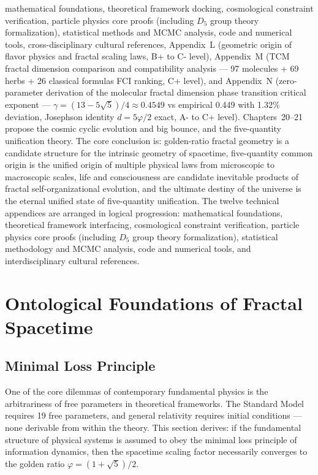 \documentclass[12pt,a4paper,twocolumn]{article}
\renewcommand{\phi}{\varphi}
\begin{document}
mathematical foundations, theoretical framework docking, cosmological constraint verification, particle physics core proofs (including $D_5$ group theory formalization), statistical methods and MCMC analysis, code and numerical tools, cross-disciplinary cultural references, Appendix~L (geometric origin of flavor physics and fractal scaling laws, B+ to C- level), Appendix~M (TCM fractal dimension comparison and compatibility analysis --- 97 molecules + 69 herbs + 26 classical formulas FCI ranking, C+ level), and Appendix~N (zero-parameter derivation of the molecular fractal dimension phase transition critical exponent --- $\gamma=(13-5\sqrt{5})/4\approx0.4549$ vs empirical 0.449 with 1.32\% deviation, Josephson identity $d=5\phi/2$ exact, A- to C+ level). Chapters~20--21 propose the cosmic cyclic evolution and big bounce, and the five-quantity unification theory. The core conclusion is: golden-ratio fractal geometry is a candidate structure for the intrinsic geometry of spacetime, five-quantity common origin is the unified origin of multiple physical laws from microscopic to macroscopic scales, life and consciousness are candidate inevitable products of fractal self-organizational evolution, and the ultimate destiny of the universe is the eternal unified state of five-quantity unification. The twelve technical appendices are arranged in logical progression: mathematical foundations, theoretical framework interfacing, cosmological constraint verification, particle physics core proofs (including $D_5$ group theory formalization), statistical methodology and MCMC analysis, code and numerical tools, and interdisciplinary cultural references.

\section{Ontological Foundations of Fractal Spacetime}
\label{sec:ontology}

\subsection{Minimal Loss Principle}
\label{subsec:min_loss}

One of the core dilemmas of contemporary fundamental physics is the arbitrariness of free parameters in theoretical frameworks. The Standard Model requires 19 free parameters, and general relativity requires initial conditions --- none derivable from within the theory. This section derives: if the fundamental structure of physical systems is assumed to obey the minimal loss principle of information dynamics, then the spacetime scaling factor necessarily converges to the golden ratio $\phi = (1+\sqrt{5})/2$.
\end{document}
